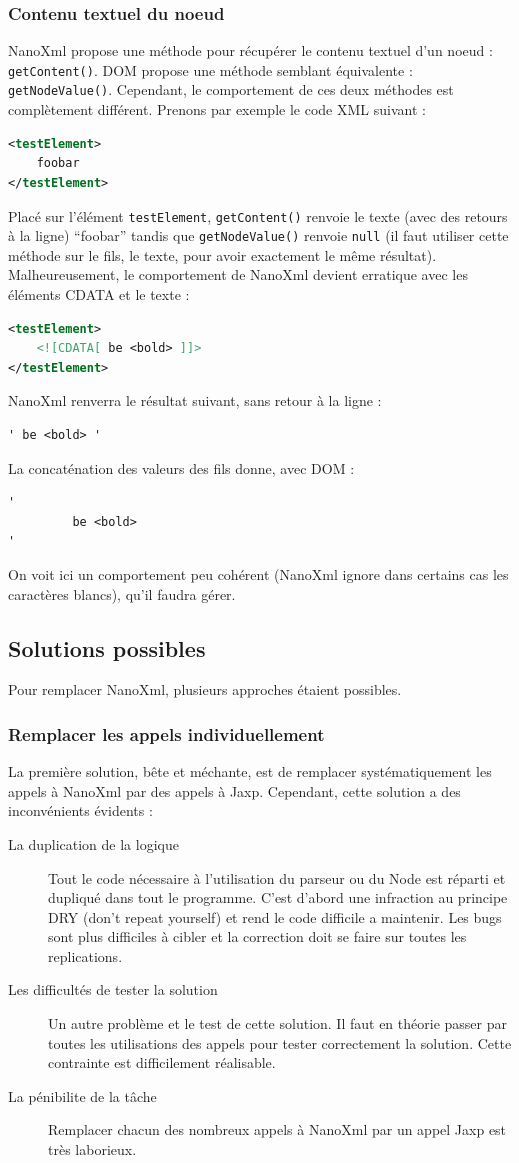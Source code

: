 \subsubsection{Contenu textuel du noeud}
NanoXml propose une méthode pour récupérer le contenu textuel d'un noeud : \verb|getContent()|.
DOM propose une méthode semblant équivalente : \verb|getNodeValue()|.
Cependant, le comportement de ces deux méthodes est complètement différent.
Prenons par exemple le code XML suivant :
\begin{lstlisting}[language=xml]
<testElement>
	foobar
</testElement>
\end{lstlisting}
Placé sur l'élément \verb|testElement|, \verb|getContent()| renvoie le texte (avec des retours à la ligne) ``foobar'' tandis que \verb|getNodeValue()| renvoie \verb|null| (il faut utiliser cette méthode sur le fils, le texte, pour avoir exactement le même résultat).
Malheureusement, le comportement de NanoXml devient erratique avec les éléments CDATA et le texte :
\begin{lstlisting}[language=xml]
<testElement>
	<![CDATA[ be <bold> ]]>
</testElement>
\end{lstlisting}
NanoXml renverra le résultat suivant, sans retour à la ligne :
\begin{verbatim}
' be <bold> '
\end{verbatim}
La concaténation des valeurs des fils donne, avec DOM :
\begin{verbatim}
'
         be <bold> 
'
\end{verbatim}
On voit ici un comportement peu cohérent (NanoXml ignore dans certains cas les caractères blancs), qu'il faudra gérer.

\subsection{Solutions possibles}
Pour remplacer NanoXml, plusieurs approches étaient possibles.

\subsubsection{Remplacer les appels individuellement}
La première solution, bête et méchante, est de remplacer systématiquement les appels à NanoXml par des appels à Jaxp.
Cependant, cette solution a des inconvénients évidents :
\begin{description}
\item[La duplication de la logique] Tout le code nécessaire à l'utilisation du parseur ou du Node est réparti et dupliqué dans tout le programme.
C'est d'abord une infraction au principe DRY (don't repeat yourself) et rend le code difficile a maintenir.
Les bugs sont plus difficiles à cibler et la correction doit se faire sur toutes les replications.
\item[Les difficultés de tester la solution] Un autre problème et le test de cette solution.
Il faut en théorie passer par toutes les utilisations des appels pour tester correctement la solution. Cette contrainte est difficilement réalisable.
\item[La pénibilite de la tâche] Remplacer chacun des nombreux appels à NanoXml par un appel Jaxp est très laborieux.
\end{description}
